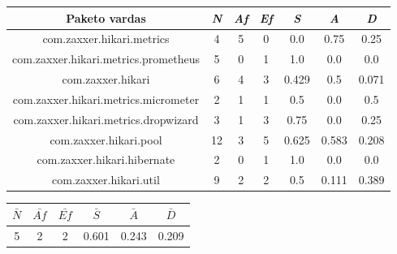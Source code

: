 

\begin{center}
    \begin{tabular}{|c|c|c|c|c|c|c|}
        \hline
        Paketo vardas & \textit{N} & \textit{Af} & \textit{Ef} & \textit{S} & \textit{A} & \textit{D} \\ [0.5ex]
        \hline\hline
        com.zaxxer.hikari.metrics & 4 & 5 & 0 & 0.0 & 0.75 & 0.25 \\
        \hline
        com.zaxxer.hikari.metrics.prometheus & 5 & 0 & 1 & 1.0 & 0.0 & 0.0 \\
        \hline
        com.zaxxer.hikari & 6 & 4 & 3 & 0.429 & 0.5 & 0.071 \\
        \hline
        com.zaxxer.hikari.metrics.micrometer & 2 & 1 & 1 & 0.5 & 0.0 & 0.5 \\
        \hline
        com.zaxxer.hikari.metrics.dropwizard & 3 & 1 & 3 & 0.75 & 0.0 & 0.25 \\
        \hline
        com.zaxxer.hikari.pool & 12 & 3 & 5 & 0.625 & 0.583 & 0.208 \\
        \hline
        com.zaxxer.hikari.hibernate & 2 & 0 & 1 & 1.0 & 0.0 & 0.0 \\
        \hline
        com.zaxxer.hikari.util & 9 & 2 & 2 & 0.5 & 0.111 & 0.389 \\
        \hline
    \end{tabular}
    \begin{tabular}{|c|c|c|c|c|c|}
        \hline
        $\bar{N}$ & $\bar{Af}$ & $\bar{Ef}$ & $\bar{S}$ & $\bar{A}$ & $\bar{D}$ \\ [0.5ex]
        \hline\hline
        5 & 2 & 2 & 0.601 & 0.243 & 0.209 \\
        \hline
    \end{tabular}
\end{center}

